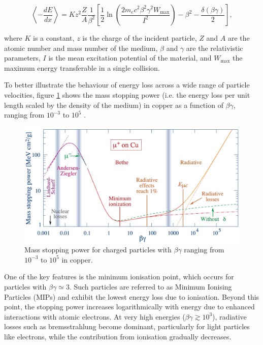 		\begin{equation}
			\left\langle -\frac{dE}{dx} \right\rangle = K z^2 \frac{Z}{A} \frac{1}{\beta^2} \left[ \frac{1}{2} \ln\left( \frac{2 m_e c^2 \beta^2 \gamma^2 W_{\text{max}}}{I^2} \right) - \beta^2 - \frac{\delta(\beta \gamma)}{2} \right],
		\end{equation}

		where $K$ is a constant, $z$ is the charge of the incident particle, $Z$ and $A$ are the atomic number and mass number of the medium, $\beta$ and $\gamma$ are the relativistic parameters, $I$ is the mean excitation potential of the material, and $W_{\text{max}}$ the maximum energy transferable in a single collision.

		To better illustrate the behaviour of energy loss across a wide range of particle velocities, figure \ref{im:bethe_bloch} shows the mass stopping power (i.e. the energy loss per unit length scaled by the density of the medium) in copper as a function of $\beta \gamma$, ranging from $10^{-3}$ to $10^5$ \cite{PDG}.

		\begin{figure}[h]
			\centering
			\includegraphics[width=0.85\linewidth]{files/bethe_bloch}
			\caption{Mass stopping power for charged particles with $\beta \gamma$ ranging from $10^{-3}$ to $10^5$ in copper.}
			\label{im:bethe_bloch}
		\end{figure}

		One of the key features is the minimum ionisation point, which occurs for particles with $\beta \gamma \simeq 3$. Such particles are referred to as Minimum Ionising Particles (MIPs) and exhibit the lowest energy loss due to ionisation. Beyond this point, the stopping power increases logarithmically with energy due to enhanced interactions with atomic electrons. At very high energies ($\beta \gamma \gtrsim 10^3$), radiative losses such as bremsstrahlung become dominant, particularly for light particles like electrons, while the contribution from ionisation gradually decreases.

